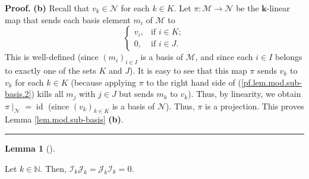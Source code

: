 \documentclass[numbers=enddot,12pt,final,onecolumn,notitlepage]{scrartcl}%
\numberwithin{exer}{subsection}
\theoremstyle{definition}
\newtheorem{lem}[theo]{Lemma}
\newenvironment{lemma}[1][]
{\begin{lem}[#1]\begin{leftbar}}
{\end{leftbar}\end{lem}}
\newenvironment{proof}[1][Proof]{\noindent\textbf{#1.} }{\ \rule{0.5em}{0.5em}}
\begin{document}
\begin{proof}
\textbf{(b)} Recall that $v_{k}\in\mathcal{N}$ for each $k\in K$. Let
$\pi:\mathcal{M}\rightarrow\mathcal{N}$ be the $\mathbf{k}$-linear map that
sends each basis element $m_{i}$ of $\mathcal{M}$ to
\[%
\begin{cases}
v_{i}, & \text{if }i\in K;\\
0, & \text{if }i\in J.
\end{cases}
\]
This is well-defined (since $\left(  m_{i}\right)  _{i\in I}$ is a basis of
$\mathcal{M}$, and since each $i\in I$ belongs to exactly one of the sets $K$
and $J$). It is easy to see that this map $\pi$ sends $v_{k}$ to $v_{k}$ for
each $k\in K$ (because applying $\pi$ to the right hand side of
(\ref{pf.lem.mod.sub-basis.2}) kills all $m_{j}$ with $j\in J$ but sends
$m_{k}$ to $v_{k}$). Thus, by linearity, we obtain $\left.  \pi\mid
_{\mathcal{N}}\right.  =\operatorname*{id}$ (since $\left(  v_{k}\right)
_{k\in K}$ is a basis of $\mathcal{N}$). Thus, $\pi$ is a projection. This
proves Lemma \ref{lem.mod.sub-basis} \textbf{(b)}.
\end{proof}

\begin{lemma}
\label{lem.row.IJ=0}Let $k\in\mathbb{N}$. Then, $\mathcal{I}_{k}%
\mathcal{J}_{k}=\mathcal{J}_{k}\mathcal{I}_{k}=0$.
\end{lemma}
\end{document}
